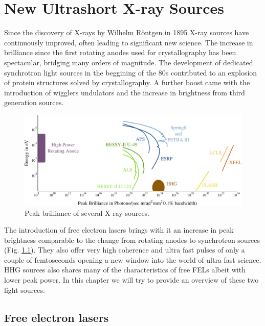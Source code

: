 \chapter{New Ultrashort X-ray Sources}\label{Ultrashort X-ray Sources}\noindent
 
Since the discovery of X-rays by Wilhelm R\"{o}ntgen in 1895 X-ray sources have
continuously improved, often leading to significant new science. The increase in
brilliance since the first rotating anodes used for crystallography has been
spectacular, bridging many orders of magnitude. The development of dedicated
synchrotron light sources in the beggining of the 80s contributed to an explosion of
protein structures solved by crystallography. A further boost came with
the introduction of wigglers undulators and the increase in brightness from
third generation sources.

 
\begin{figure}[h]
\centering
  \includegraphics[width=1.0 \columnwidth]{brilliance.png}
  \caption{Peak brilliance of several X-ray sources.}
  \label{Fig:Brilliance}
\end{figure}

The introduction of free electron lasers brings with it an increase in peak
brightness comparable to the change from rotating anodes to synchrotron sources
(Fig. \ref{Fig:Brilliance}). They also offer very high coherence and ultra fast
pulses of only a couple of femtoseconds opening a new window into the world of
ultra fast science. HHG sources also shares many of the characteristics of free
FELs albeit with lower peak power. In this chapter we will try to provide an
overview of these two light sources.

\section{Free electron lasers}

